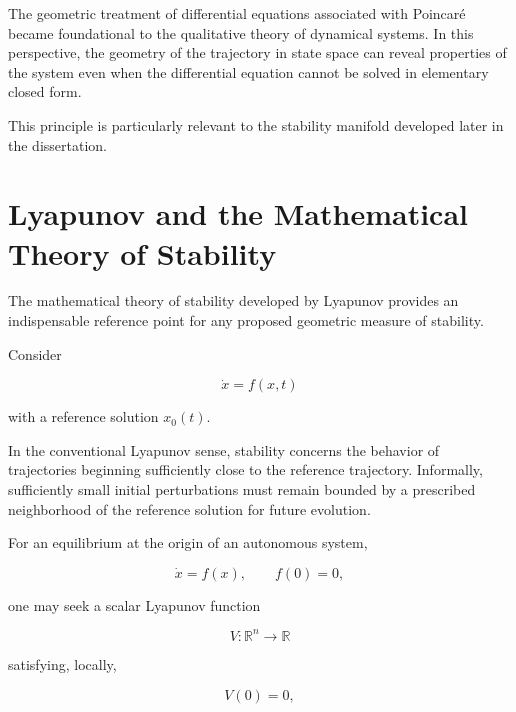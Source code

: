 \documentclass[12pt,oneside]{book}
\begin{document}
The geometric treatment of differential equations associated
with Poincaré became foundational to the qualitative theory of
dynamical systems. In this perspective, the geometry of the
trajectory in state space can reveal properties of the system
even when the differential equation cannot be solved in
elementary closed form.

This principle is particularly relevant to the stability
manifold developed later in the dissertation.


\section{Lyapunov and the Mathematical Theory of Stability}
\label{sec:lyapunov-history}

The mathematical theory of stability developed by Lyapunov
provides an indispensable reference point for any proposed
geometric measure of stability.

Consider

\begin{equation}
    \dot{x}
    =
    f(x,t)
    \label{eq:lyapunov-general-system}
\end{equation}

with a reference solution \(x_0(t)\).

In the conventional Lyapunov sense, stability concerns the
behavior of trajectories beginning sufficiently close to the
reference trajectory. Informally, sufficiently small initial
perturbations must remain bounded by a prescribed neighborhood
of the reference solution for future evolution.

For an equilibrium at the origin of an autonomous system,

\begin{equation}
    \dot{x}
    =
    f(x),
    \qquad
    f(0)=0,
\end{equation}

one may seek a scalar Lyapunov function

\begin{equation}
    V:
    \mathbb{R}^n
    \rightarrow
    \mathbb{R}
\end{equation}

satisfying, locally,

\begin{equation}
    V(0)=0,
\end{equation}
\end{document}
